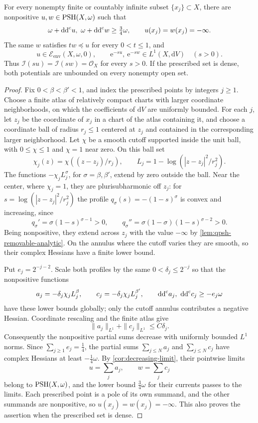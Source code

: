 \begin{theorem}\label{thm:countable-pole-stretching}
For every nonempty finite or countably infinite subset $\{x_j\}\subset X$, there are nonpositive $u,w\in\mathrm{PSH}(X,\omega)$ such that
\[
 \omega+\mathrm{dd}^{\mathrm{c}} u,\ \omega+\mathrm{dd}^{\mathrm{c}} w\geq\tfrac34\omega,
 \qquad u(x_j)=w(x_j)=-\infty.
\]
The same $w$ satisfies $tw\preceq u$ for every $0<t\leq1$, and
\[
 u\in\mathcal E_{\mathrm{env}}(X,\omega,0),\qquad
 \mathrm e^{-su},\ \mathrm e^{-sw}\in L^1(X,\mathrm dV)
 \quad(s>0).
\]
Thus $\mathcal I(su)=\mathcal I(sw)=\mathcal O_X$ for every $s>0$. If the prescribed set is dense, both potentials are unbounded on every nonempty open set.
\end{theorem}
\begin{proof}
Fix $0<\beta<\beta'<1$, and index the prescribed points by integers $j\geq1$. Choose a finite atlas of relatively compact charts with larger coordinate neighborhoods, on which the coefficients of $\mathrm dV$ are uniformly bounded. For each $j$, let $z_j$ be the coordinate of $x_j$ in a chart of the atlas containing it, and choose a coordinate ball of radius $r_j\leq1$ centered at $z_j$ and contained in the corresponding larger neighborhood. Let $\chi$ be a smooth cutoff supported inside the unit ball, with $0\leq\chi\leq1$ and $\chi=1$ near zero. On this ball set
\[
 \chi_j(z)=\chi((z-z_j)/r_j),\qquad
 L_j=1-\log(|z-z_j|^2/r_j^2).
\]
The functions $-\chi_jL_j^\sigma$, for $\sigma=\beta,\beta'$, extend by zero outside the ball. Near the center, where $\chi_j=1$, they are plurisubharmonic off $z_j$: for $s=\log(|z-z_j|^2/r_j^2)$ the profile $q_\sigma(s)=-(1-s)^\sigma$ is convex and increasing, since
\[
 q_\sigma'=\sigma(1-s)^{\sigma-1}>0,
 \qquad q_\sigma''=\sigma(1-\sigma)(1-s)^{\sigma-2}>0.
\]
Being nonpositive, they extend across $z_j$ with the value $-\infty$ by \cref{lem:qpsh-removable-analytic}. On the annulus where the cutoff varies they are smooth, so their complex Hessians have a finite lower bound.

Put $e_j=2^{-j-2}$. Scale both profiles by the same $0<\delta_j\leq2^{-j}$ so that the nonpositive functions
\begin{equation}\label{eq:countable-pole-terms}
 a_j=-\delta_j\chi_jL_j^\beta,
 \qquad c_j=-\delta_j\chi_jL_j^{\beta'},
 \qquad \mathrm{dd}^{\mathrm{c}} a_j,\ \mathrm{dd}^{\mathrm{c}} c_j\geq-e_j\omega
\end{equation}
have these lower bounds globally; only the cutoff annulus contributes a negative Hessian. Coordinate rescaling and the finite atlas give
\[
 \|a_j\|_{L^1}+\|c_j\|_{L^1}\leq C\delta_j.
\]
Consequently the nonpositive partial sums decrease with uniformly bounded $L^1$ norms. Since $\sum_{j\geq1}e_j=\frac14$, the partial sums $\sum_{j\leq N}a_j$ and $\sum_{j\leq N}c_j$ have complex Hessians at least $-\frac14\omega$. By \cref{cor:decreasing-limit}, their pointwise limits
\[
 u=\sum_j a_j,\qquad w=\sum_j c_j
\]
belong to $\mathrm{PSH}(X,\omega)$, and the lower bound $\frac34\omega$ for their currents passes to the limits. Each prescribed point is a pole of its own summand, and the other summands are nonpositive, so $u(x_j)=w(x_j)=-\infty$. This also proves the assertion when the prescribed set is dense.


\end{proof}
